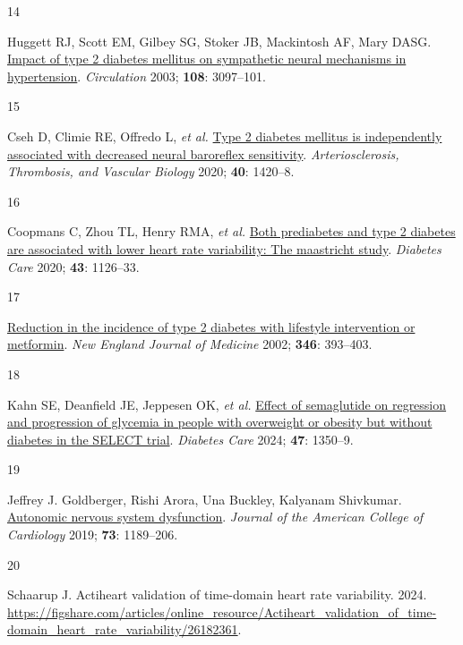 \documentclass[
  a4paper,
  headsepline=true,
  open=any]{scrbook}
\newlength{\cslhangindent}
\newlength{\csllabelwidth}
\newlength{\cslentryspacingunit} %
\newenvironment{CSLReferences}[2] %
 {%
  \setlength{\parindent}{0pt}
  \ifodd #1
  \let\oldpar\par
  \def\par{\hangindent=\cslhangindent\oldpar}
  \fi
  \setlength{\parskip}{#2\cslentryspacingunit}
 }%
 {}
\newcommand{\CSLLeftMargin}[1]{\parbox[t]{\csllabelwidth}{#1}}
\newcommand{\CSLRightInline}[1]{\parbox[t]{\linewidth - \csllabelwidth}{#1}\break}
\begin{document}
\begin{CSLReferences}{0}{0}
\leavevmode{}%
\CSLLeftMargin{14 }%
\CSLRightInline{Huggett RJ, Scott EM, Gilbey SG, Stoker JB, Mackintosh
AF, Mary DASG.
\href{https://doi.org/10.1161/01.CIR.0000103123.66264.FE}{Impact of type
2 diabetes mellitus on sympathetic neural mechanisms in hypertension}.
\emph{Circulation} 2003; \textbf{108}: 3097--101.}

\leavevmode{}%
\CSLLeftMargin{15 }%
\CSLRightInline{Cseh D, Climie RE, Offredo L, \emph{et al.}
\href{https://doi.org/10.1161/ATVBAHA.120.314102}{Type 2 diabetes
mellitus is independently associated with decreased neural baroreflex
sensitivity}. \emph{Arteriosclerosis, Thrombosis, and Vascular Biology}
2020; \textbf{40}: 1420--8.}

\leavevmode{}%
\CSLLeftMargin{16 }%
\CSLRightInline{Coopmans C, Zhou TL, Henry RMA, \emph{et al.}
\href{https://doi.org/10.2337/dc19-2367}{Both prediabetes and type 2
diabetes are associated with lower heart rate variability: The
maastricht study}. \emph{Diabetes Care} 2020; \textbf{43}: 1126--33.}

\leavevmode{}%
\CSLLeftMargin{17 }%
\CSLRightInline{\href{https://doi.org/10.1056/NEJMoa012512}{Reduction in
the incidence of type 2 diabetes with lifestyle intervention or
metformin}. \emph{New England Journal of Medicine} 2002; \textbf{346}:
393--403.}

\leavevmode{}%
\CSLLeftMargin{18 }%
\CSLRightInline{Kahn SE, Deanfield JE, Jeppesen OK, \emph{et al.}
\href{https://doi.org/10.2337/dc24-0491}{Effect of semaglutide on
regression and progression of glycemia in people with overweight or
obesity but without diabetes in the SELECT trial}. \emph{Diabetes Care}
2024; \textbf{47}: 1350--9.}

\leavevmode{}%
\CSLLeftMargin{19 }%
\CSLRightInline{Jeffrey J. Goldberger, Rishi Arora, Una Buckley,
Kalyanam Shivkumar.
\href{https://doi.org/doi:10.1016/j.jacc.2018.12.064}{Autonomic nervous
system dysfunction}. \emph{Journal of the American College of
Cardiology} 2019; \textbf{73}: 1189--206.}

\leavevmode{}%
\CSLLeftMargin{20 }%
\CSLRightInline{Schaarup J. Actiheart validation of time-domain heart
rate variability. 2024.
\url{https://figshare.com/articles/online_resource/Actiheart_validation_of_time-domain_heart_rate_variability/26182361}.}


\end{CSLReferences}
\end{document}
